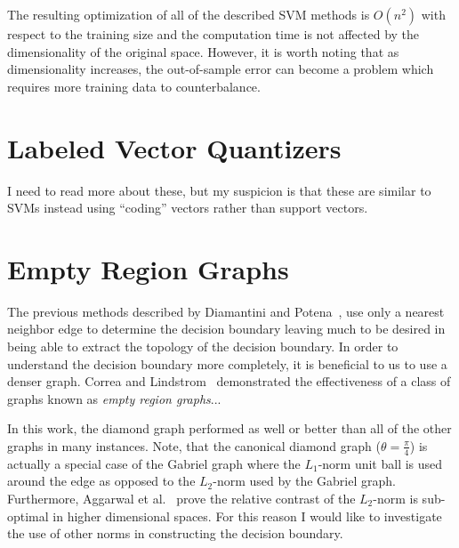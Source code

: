 \documentclass[12pt]{article}
\begin{document}
The resulting optimization of all of the described SVM methods is $O(n^2)$ with
respect to the training size and the computation time is not affected by the
dimensionality of the original space.
%
However, it is worth noting that as dimensionality increases, the out-of-sample
error can become a problem which requires more training data to counterbalance.

\section{Labeled Vector Quantizers}

I need to read more about these, but my suspicion is that these are similar to
SVMs instead using ``coding'' vectors rather than support vectors.

\section{Empty Region Graphs}

The previous methods described by Diamantini and
Potena~\cite{DiamantiniPotena2007}, use only a nearest neighbor edge to
determine the decision boundary leaving much to be desired in being able to
extract the topology of the decision boundary.
%
In order to understand the decision boundary more completely, it is beneficial
to us to use a denser graph.
%
Correa and Lindstrom~\cite{CorreaLindstrom2011} demonstrated the effectiveness
of a class of graphs known as \emph{empty region graphs}...

In this work, the diamond graph performed as well or better than all of the
other graphs in many instances.
%
Note, that the canonical diamond graph ($\theta=\frac{\pi}{4}$) is actually a
special case of the Gabriel graph where the $L_1$-norm unit ball is used around
the edge as opposed to the $L_2$-norm used by the Gabriel graph.
%
Furthermore, Aggarwal et al.~\cite{AggarwalHinneburgKeim2001} prove the relative
contrast of the $L_2$-norm is sub-optimal in higher dimensional spaces.
%
For this reason I would like to investigate the use of other norms in
constructing the decision boundary.
\end{document}
